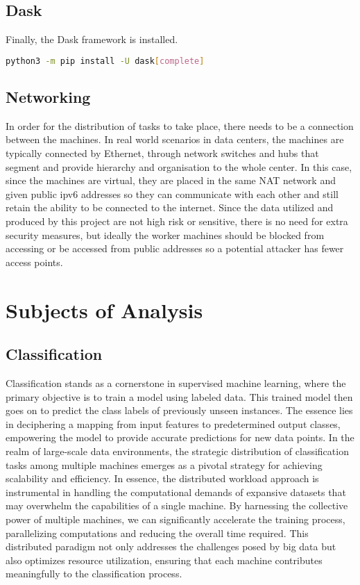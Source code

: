 \documentclass[conference]{IEEEtran}
\begin{document}
\subsection{Dask}
Finally, the Dask framework is installed.
\begin{lstlisting}[language=bash]
python3 -m pip install -U dask[complete]
\end{lstlisting}
\subsection{Networking}
In order for the distribution of tasks to take place, there needs to be a connection between the machines. In real world scenarios in data centers, the machines are typically connected by Ethernet, through network switches and hubs that segment and provide hierarchy and organisation to the whole center. In this case, since the machines are virtual, they are placed in the same NAT network and given public ipv6 addresses so they can communicate with each other and still retain the ability to be connected to the internet. Since the data utilized and produced by this project are not high risk or sensitive, there is no need for extra security measures, but ideally the worker machines should be blocked from accessing or be accessed from public addresses so a potential attacker has fewer access points.
\section{Subjects of Analysis}

\subsection{Classification\cite{b9}}
Classification stands as a cornerstone in supervised machine learning, where the primary objective is to train a model using labeled data. This trained model then goes on to predict the class labels of previously unseen instances. The essence lies in deciphering a mapping from input features to predetermined output classes, empowering the model to provide accurate predictions for new data points. In the realm of large-scale data environments, the strategic distribution of classification tasks among multiple machines emerges as a pivotal strategy for achieving scalability and efficiency. In essence, the distributed workload approach is instrumental in handling the computational demands of expansive datasets that may overwhelm the capabilities of a single machine. By harnessing the collective power of multiple machines, we can significantly accelerate the training process, parallelizing computations and reducing the overall time required. This distributed paradigm not only addresses the challenges posed by big data but also optimizes resource utilization, ensuring that each machine contributes meaningfully to the classification process.
\end{document}
